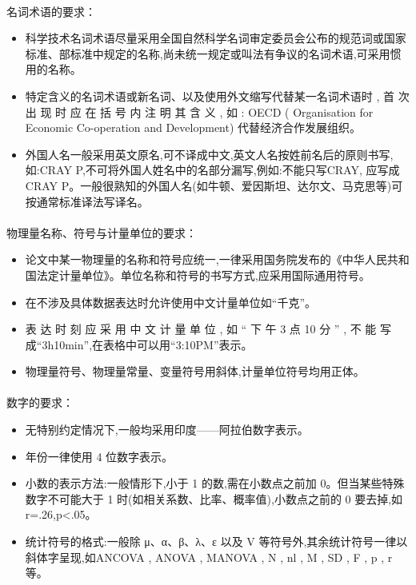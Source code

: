 ﻿\documentclass{sysuthesis}
\begin{document}
\paragraph{}名词术语的要求：

\begin{itemize}
\item 科学技术名词术语尽量采用全国自然科学名词审定委员会公布的规范词或国家标准、部标准中规定的名称,尚未统一规定或叫法有争议的名词术语,可采用惯用的名称。
\item 特定含义的名词术语或新名词、以及使用外文缩写代替某一名词术语时 , 首 次 出 现 时 应 在 括 号 内 注 明 其 含 义 , 如 : OECD ( Organisation for Economic Co-operation and Development) 代替经济合作发展组织。
\item 外国人名一般采用英文原名,可不译成中文,英文人名按姓前名后的原则书写,如:CRAY P,不可将外国人姓名中的名部分漏写,例如:不能只写CRAY, 应写成 CRAY P。一般很熟知的外国人名(如牛顿、爱因斯坦、达尔文、马克思等)可按通常标准译法写译名。
\end{itemize}

\paragraph{}物理量名称、符号与计量单位的要求：

\begin{itemize}
\item 论文中某一物理量的名称和符号应统一,一律采用国务院发布的《中华人民共和国法定计量单位》。单位名称和符号的书写方式,应采用国际通用符号。
\item 在不涉及具体数据表达时允许使用中文计量单位如“千克”。
\item 表 达 时 刻 应 采 用 中 文 计 量 单 位 , 如 “ 下 午 3 点 10 分 ” , 不 能 写 成“3h10min”,在表格中可以用“3:10PM”表示。
\item 物理量符号、物理量常量、变量符号用斜体,计量单位符号均用正体。
\end{itemize}

\paragraph{}数字的要求：

\begin{itemize}
\item 无特别约定情况下,一般均采用印度——阿拉伯数字表示。
\item 年份一律使用 4 位数字表示。
\item 小数的表示方法:一般情形下,小于 1 的数,需在小数点之前加 0。但当某些特殊数字不可能大于 1 时(如相关系数、比率、概率值),小数点之前的 0 要去掉,如 r=.26,p<.05。
\item 统计符号的格式:一般除 μ、α、β、λ、ε 以及 V 等符号外,其余统计符号一律以斜体字呈现,如ANCOVA , ANOVA , MANOVA , N , nl , M , SD , F , p , r 等。
\end{itemize}
\end{document}
